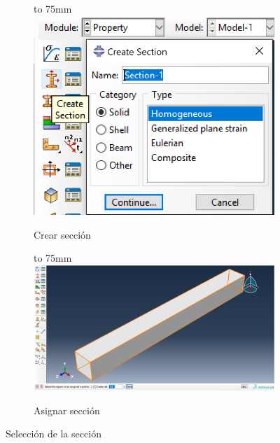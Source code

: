 \documentclass[spanish,a4paper,12pt]{article}
\def\imagebox#1#2{\vtop to #1{\null\hbox{#2}\vfill}}
\begin{document}
\begin{figure}[h!tp]
\centering
\captionsetup[subfigure]{justification=centering,singlelinecheck=false}
  \begin{subfigure}[b]{0.20\textwidth}
  \hspace{0mm}
    \imagebox{75mm}{\includegraphics[scale=0.3]{capturas/prop1.png}}
    \caption{Crear sección\label{fig:bar4a}}
  \end{subfigure}
  \begin{subfigure}[b]{0.79\textwidth}
  \hspace{0mm}
    \imagebox{75mm}{\includegraphics[scale=0.32]{capturas/prop2.png}}
    \caption{Asignar sección\label{fig:bar4b}}
  \end{subfigure}
\caption{Selección de la sección}
\label{fig:bar4}
\end{figure}

\clearpage
\end{document}
